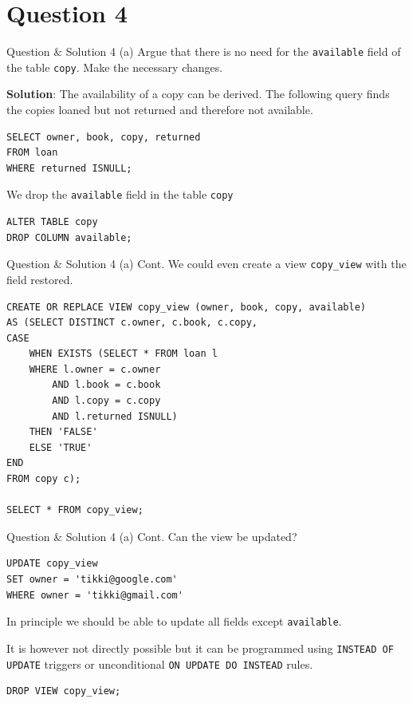 \section*{Question 4}

\begin{frame}[fragile]{Question \& Solution 4 (a)}
Argue that there is no need for the \texttt{available} field of the table \texttt{copy}. Make the necessary changes. \vspace{10pt}

\textbf{Solution}:
The availability of a copy can be derived. \vspace{10pt}
The following query finds the copies loaned but not returned and therefore not available.
\begin{lstlisting}
SELECT owner, book, copy, returned 
FROM loan 
WHERE returned ISNULL;
\end{lstlisting}

We drop the \texttt{available} field in the table \texttt{copy}

\begin{lstlisting}
ALTER TABLE copy
DROP COLUMN available;
\end{lstlisting}

\end{frame}

\begin{frame}[fragile]{Question \& Solution 4 (a) Cont.}
We could even create a view \texttt{copy\_view} with the field restored.

\begin{lstlisting}
CREATE OR REPLACE VIEW copy_view (owner, book, copy, available) 
AS (SELECT DISTINCT c.owner, c.book, c.copy, 
CASE
	WHEN EXISTS (SELECT * FROM loan l  
	WHERE l.owner = c.owner
		AND l.book = c.book
		AND l.copy = c.copy 
		AND l.returned ISNULL) 
	THEN 'FALSE'
	ELSE 'TRUE' 
END
FROM copy c);

SELECT * FROM copy_view;
\end{lstlisting}

\end{frame}

\begin{frame}[fragile]{Question \& Solution 4 (a) Cont.}
Can the view be updated? 

\begin{lstlisting}
UPDATE copy_view 
SET owner = 'tikki@google.com' 
WHERE owner = 'tikki@gmail.com'
\end{lstlisting}

In principle we should be able to update all fields except \texttt{available}.  \vspace{10pt}

It is however not directly possible but it can be programmed using \texttt{INSTEAD OF UPDATE} triggers or  unconditional \texttt{ON UPDATE DO INSTEAD} rules.

\begin{lstlisting}
DROP VIEW copy_view;
\end{lstlisting}
\end{frame}

